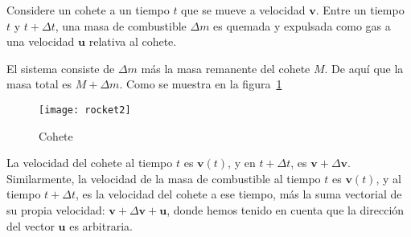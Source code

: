Considere un cohete a un tiempo $t$ que se mueve a velocidad $\mathbf{v}$. Entre un tiempo $t$ y $t+\Delta t$, una masa de combustible $\Delta m$ es quemada y expulsada como gas a una velocidad $\mathbf{u}$ relativa al cohete.

El sistema consiste de $\Delta m$ más la masa remanente del cohete $M$. De aquí que la masa total es $M+\Delta m$. Como se muestra en la figura~\ref{fig:rocket}
\begin{frame}
  \begin{figure}
  \centering
{\texttt{[image: rocket2]}}
  \caption{Cohete}
  \label{fig:rocket}
\end{figure}
\end{frame}

La velocidad del cohete al tiempo $t$ es $\mathbf{v}(t)$, y en $t+\Delta t$, es $\mathbf{v}+\Delta\mathbf{v}$. Similarmente, la velocidad de la masa de combustible al tiempo $t$ es $\mathbf{v}(t)$, y al tiempo $t+\Delta t$, es la velocidad del cohete a ese tiempo, más la suma vectorial de su propia velocidad: $\mathbf{v}+\Delta\mathbf{v}+\mathbf{u}$, donde hemos tenido en cuenta que la dirección del vector $\mathbf{u}$ es arbitraria. 

